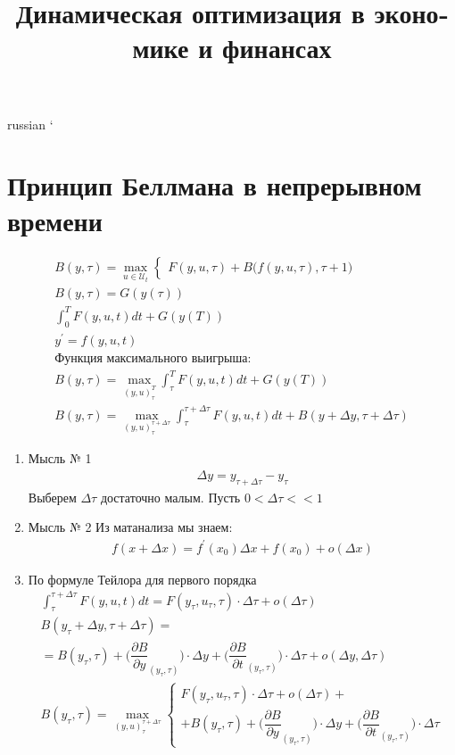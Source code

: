 \documentclass{article}
\begin{document}
\title{\foreignlanguage{russian}{Динамическая оптимизация в экономике и финансах}}
\maketitle

\begin{otherlanguage*}{russian}
`\section*{Принцип Беллмана в непрерывном времени}
\begin{align*}
B(y, \tau) = \max_{u \in \mathcal{U}_t} \begin{cases} F(y, u, \tau) + B \Big( f(y, u, \tau), \tau + 1 \Big) 
\end{cases}  \\
B(y, \tau) = G(y(\tau)) \\
\int_0^{T} F(y, u, t) dt + G(y(T)) \\
y^{'} = f(y, u, t) \\
\text{Функция максимального выигрыша: } \\
B(y, \tau) = \max_{(y, u)^T_{\tau}} \int_{\tau}^T F(y, u, t) dt + G(y (T)) \\
B(y, \tau) = \max_{(y, u)_{\tau}^{\tau + \Delta \tau}} \int_{\tau}^{\tau + \Delta \tau} F(y, u, t) dt + B(y + \Delta y, \tau + \Delta \tau) 
\end{align*}
\begin{enumerate}
\item Мысль № 1
\begin{align*}
\Delta y = y_{\tau + \Delta \tau} - y_{\tau} 
\end{align*} 
Выберем $ \Delta \tau $ достаточно малым. Пусть $ 0 < \Delta \tau << 1 $ 
\item Мысль № 2
Из матанализа мы знаем: 
\begin{align*}
f(x + \Delta x) = f^{'} (x_0) \Delta x + f(x_0) +  o(\Delta x) 
\end{align*}
\item По формуле Тейлора для первого порядка 
\begin{align*}
\int_\tau^{\tau + \Delta \tau} F(y, u, t) dt  = F(y_\tau, u_\tau, \tau) \cdot \Delta \tau + o(\Delta \tau) \\
B(y_\tau + \Delta y, \tau + \Delta \tau) = \\ 
= B(y_\tau, \tau) + \Big(\dfrac{\partial B}{\partial y}_{(y_\tau, \tau)}\Big) \cdot \Delta y + \Big(\dfrac{\partial B}{\partial t}_{(y_\tau, \tau)}\Big) \cdot \Delta \tau + o(\Delta y, \Delta \tau) \\
B(y_\tau, \tau) = \max_{(y, u)^{\tau + \Delta \tau}_{\tau}} \begin{cases} F(y_\tau, u_\tau, \tau) \cdot \Delta \tau + o(\Delta \tau) + \\ + B(y_\tau, \tau) + \Big(\dfrac{\partial B}{\partial y}_{(y_\tau, \tau)}\Big) \cdot \Delta y + \Big(\dfrac{\partial B}{\partial t}_{(y_\tau, \tau)}\Big) \cdot \Delta \tau  \end{cases}
\end{align*}


\end{enumerate}
\end{otherlanguage*}
\end{document}

